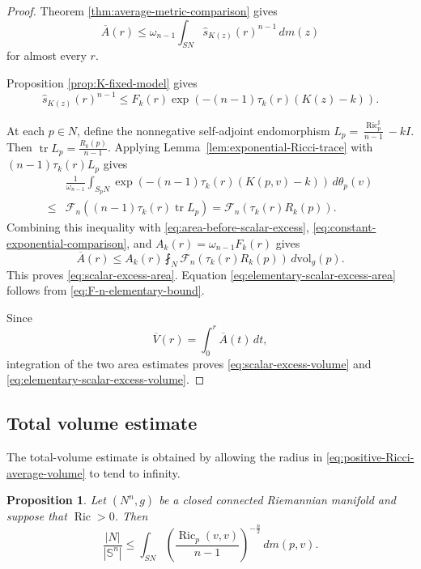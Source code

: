 \documentclass[11pt, reqno]{amsart}
\newtheorem{proposition}{Proposition}
\begin{document}
\begin{proof}
Theorem \ref{thm:average-metric-comparison} gives
\begin{equation}\label{eq:area-before-scalar-excess}
\overline A(r)
\le
\omega_{n-1}\int_{SN}
\widehat s_{K(z)}(r)^{n-1}\, dm(z)
\end{equation}
for almost every $r$.

Proposition \ref{prop:K-fixed-model} gives
\begin{equation}\label{eq:constant-exponential-comparison}
\widehat s_{K(z)}(r)^{n-1}
\le
F_k(r)
\exp\left(
-(n-1)\tau_k(r)(K(z)-k)
\right).
\end{equation}

At each $p\in N$, define the nonnegative self-adjoint endomorphism $L_p = \frac{\operatorname{Ric}_p^{\sharp}}{n-1}-kI$.
Then $\operatorname{tr} L_p=\frac{R_k(p)}{n-1}$.
Applying Lemma~\ref{lem:exponential-Ricci-trace} with $(n-1)\tau_k(r)L_p$ gives
\begin{align*}
& \frac{1}{\omega_{n-1}}
\int_{S_pN}
\exp\left(
-(n-1)\tau_k(r)(K(p, v)-k)
\right)\, d\theta_p(v)\\
\le&
\mathcal F_n\left(
(n-1)\tau_k(r)\operatorname{tr}L_p
\right)
=
\mathcal F_n\left(\tau_k(r)R_k(p)\right).
\end{align*}
Combining this inequality with
\eqref{eq:area-before-scalar-excess},
\eqref{eq:constant-exponential-comparison}, and
$A_k(r)=\omega_{n-1}F_k(r)$ gives
$$
\overline A(r)
\le
A_k(r)\fint_N
\mathcal F_n\left(\tau_k(r)R_k(p)\right)\, d\mathrm{vol}_g(p).
$$
This proves \eqref{eq:scalar-excess-area}.
Equation \eqref{eq:elementary-scalar-excess-area} follows from
\eqref{eq:F-n-elementary-bound}.

Since
$$\overline V(r)=\int_0^r \overline A(t)\, dt, $$
integration of the two area estimates proves
\eqref{eq:scalar-excess-volume} and
\eqref{eq:elementary-scalar-excess-volume}.
\end{proof}
\subsection{Total volume estimate}

The total-volume estimate is obtained by allowing the radius in
\eqref{eq:positive-Ricci-average-volume} to tend to infinity.

\begin{proposition}\label{prop:spectrum}
Let $(N^n, g)$ be a closed connected Riemannian manifold and suppose that
$\operatorname{Ric}>0$. Then
\begin{equation}\label{eq:spectrum-bound}
\frac{|N|}{|\mathbb S^n|}
\le
\int_{SN}
\left(
\frac{\operatorname{Ric}_p(v, v)}{n-1}
\right)^{-\frac n2}
\, dm(p, v).
\end{equation}
\end{proposition}
\end{document}
